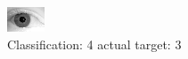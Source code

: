 \begin{figure}[h!]
\begin{center}
\includegraphics[width=0.60\columnwidth]{figures/ID2209_class_4_target_3.png}
\end{center}
\caption{ Classification: 4 actual target: 3}
\label{fig:ID2209_class_4_target_3}
\end{figure}
